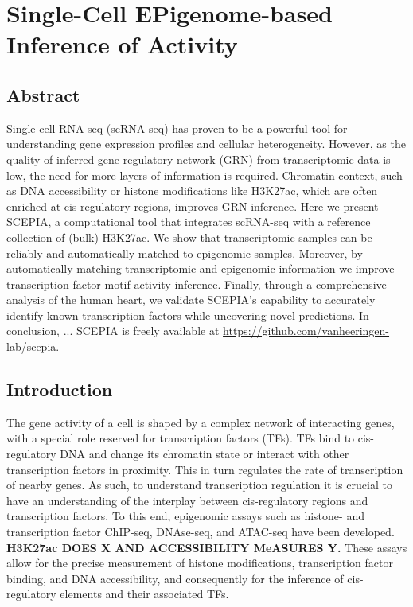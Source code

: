\chapter{Single-Cell EPigenome-based Inference of Activity}\thumbforchapter
{}
\newpage

\section{Abstract}

Single-cell RNA-seq (scRNA-seq) has proven to be a powerful tool for understanding gene expression profiles and cellular heterogeneity. However, as the quality of inferred gene regulatory network (GRN) from transcriptomic data is low, the need for more layers of information is required. Chromatin context, such as DNA accessibility or histone modifications like H3K27ac, which are often enriched at cis-regulatory regions, improves GRN inference. Here we present SCEPIA, a computational tool that integrates scRNA-seq with a reference collection of (bulk) H3K27ac. We show that transcriptomic samples can be reliably and automatically matched to epigenomic samples. Moreover, by automatically matching transcriptomic and epigenomic information we improve transcription factor motif activity inference. Finally, through a comprehensive analysis of the human heart, we validate SCEPIA's capability to accurately identify known transcription factors while uncovering novel predictions. In conclusion, ...  SCEPIA is freely available at \url{https://github.com/vanheeringen-lab/scepia}.

\section{Introduction}

The gene activity of a cell is shaped by a complex network of interacting genes, with a special role reserved for transcription factors (TFs). TFs bind to cis-regulatory DNA and change its chromatin state or interact with other transcription factors in proximity\cite{Spitz2012}. This in turn regulates the rate of transcription of nearby genes. As such, to understand transcription regulation it is crucial to have an understanding of the interplay between cis-regulatory regions and transcription factors. To this end, epigenomic assays such as histone- and transcription factor ChIP-seq\cite{Robertson_2007}, DNAse-seq\cite{Boyle_2008}, and ATAC-seq\cite{Buenrostro_2013} have been developed. \textbf{H3K27ac DOES X AND ACCESSIBILITY MeASURES Y.} These assays allow for the precise measurement of histone modifications, transcription factor binding, and DNA accessibility, and consequently for the inference of cis-regulatory elements and their associated TFs.

